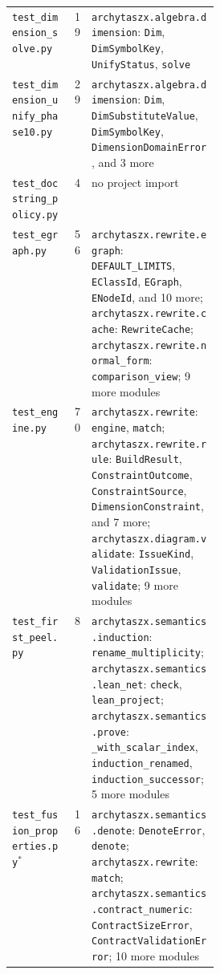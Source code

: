 \begin{xltabular}{\linewidth}{@{}>{\raggedright\arraybackslash}p{0.3\linewidth}r>{\raggedright\arraybackslash}X@{}}
\texttt{test\_\allowbreak{}dimension\_\allowbreak{}solve.py} & 19 & \texttt{archytaszx.\allowbreak{}algebra.\allowbreak{}dimension}: \texttt{Dim}, \texttt{DimSymbolKey}, \texttt{UnifyStatus}, \texttt{solve} \\
\texttt{test\_\allowbreak{}dimension\_\allowbreak{}unify\_\allowbreak{}phase10.py} & 29 & \texttt{archytaszx.\allowbreak{}algebra.\allowbreak{}dimension}: \texttt{Dim}, \texttt{DimSubstituteValue}, \texttt{DimSymbolKey}, \texttt{DimensionDomainError}, and 3 more \\
\texttt{test\_\allowbreak{}docstring\_\allowbreak{}policy.py} & 4 & no project import \\
\texttt{test\_\allowbreak{}egraph.py} & 56 & \texttt{archytaszx.\allowbreak{}rewrite.\allowbreak{}egraph}: \texttt{DEFAULT\_\allowbreak{}LIMITS}, \texttt{EClassId}, \texttt{EGraph}, \texttt{ENodeId}, and 10 more; \texttt{archytaszx.\allowbreak{}rewrite.\allowbreak{}cache}: \texttt{RewriteCache}; \texttt{archytaszx.\allowbreak{}rewrite.\allowbreak{}normal\_\allowbreak{}form}: \texttt{comparison\_\allowbreak{}view}; 9 more modules \\
\texttt{test\_\allowbreak{}engine.py} & 70 & \texttt{archytaszx.\allowbreak{}rewrite}: \texttt{engine}, \texttt{match}; \texttt{archytaszx.\allowbreak{}rewrite.\allowbreak{}rule}: \texttt{BuildResult}, \texttt{ConstraintOutcome}, \texttt{ConstraintSource}, \texttt{DimensionConstraint}, and 7 more; \texttt{archytaszx.\allowbreak{}diagram.\allowbreak{}validate}: \texttt{IssueKind}, \texttt{ValidationIssue}, \texttt{validate}; 9 more modules \\
\texttt{test\_\allowbreak{}first\_\allowbreak{}peel.py} & 8 & \texttt{archytaszx.\allowbreak{}semantics.\allowbreak{}induction}: \texttt{rename\_\allowbreak{}multiplicity}; \texttt{archytaszx.\allowbreak{}semantics.\allowbreak{}lean\_\allowbreak{}net}: \texttt{check}, \texttt{lean\_\allowbreak{}project}; \texttt{archytaszx.\allowbreak{}semantics.\allowbreak{}prove}: \texttt{\_\allowbreak{}with\_\allowbreak{}scalar\_\allowbreak{}index}, \texttt{induction\_\allowbreak{}renamed}, \texttt{induction\_\allowbreak{}successor}; 5 more modules \\
\texttt{test\_\allowbreak{}fusion\_\allowbreak{}properties.py}$^{\ast}$ & 16 & \texttt{archytaszx.\allowbreak{}semantics.\allowbreak{}denote}: \texttt{DenoteError}, \texttt{denote}; \texttt{archytaszx.\allowbreak{}rewrite}: \texttt{match}; \texttt{archytaszx.\allowbreak{}semantics.\allowbreak{}contract\_\allowbreak{}numeric}: \texttt{ContractSizeError}, \texttt{ContractValidationError}; 10 more modules \\

\end{xltabular}
